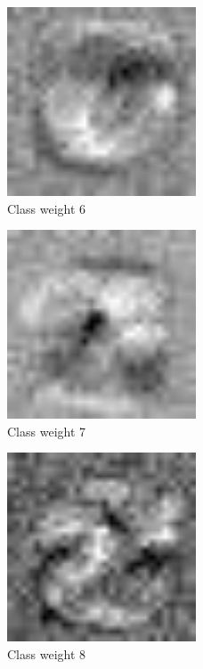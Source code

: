 \begin{figure}[]
    \centering
    \includegraphics[width=0.50\textwidth]{figures/weights/class_6_weight_image.jpg}
    \caption{Class weight 6}
    \label{fig:class_weight_6}
\end{figure}

\begin{figure}[]
    \centering
    \includegraphics[width=0.50\textwidth]{figures/weights/class_7_weight_image.jpg}
    \caption{Class weight 7}
    \label{fig:class_weight_7}
\end{figure}

\begin{figure}[]
    \centering
    \includegraphics[width=0.50\textwidth]{figures/weights/class_8_weight_image.jpg}
    \caption{Class weight 8}
    \label{fig:class_weight_8}
\end{figure}

